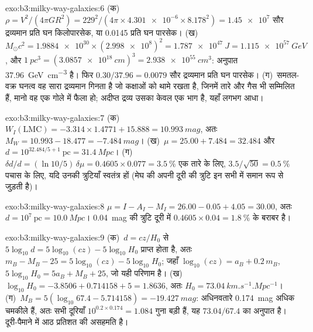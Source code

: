 \begin{solution}{exo:b3:milky-way-galaxies:6}
(क)~$\rho = V^2/(4\pi GR^2) = 229^2/(4\pi\times\num{4.301e-6}\times
8.178^2) = \num{1.45e7}$ सौर द्रव्यमान प्रति घन किलोपारसेक, या
\num{0.0145} प्रति घन पारसेक। (ख)~$M_\odot c^2 = \num{1.9884e30}\times
(\num{2.998e8})^2 = \qty{1.787e47}{J} = \qty{1.115e57}{GeV}$, और
$\qty{1}{pc^3} = (\qty{3.0857e18}{cm})^3 = \qty{2.938e55}{cm^3}$:
अनुपात \qty{37.96}{GeV.cm^{-3}} है। फिर $0.30/37.96 = \num{0.0079}$ सौर
द्रव्यमान प्रति घन पारसेक। (ग)~समतल-वक्र घनत्व वह सारा द्रव्यमान गिनता है
जो कक्षाओं को थामे रखता है, जिनमें तारे और गैस भी सम्मिलित हैं, मानो वह एक
गोले में फैला हो; अदीप्त द्रव्य उसका केवल एक भाग है, यहाँ लगभग आधा।
\end{solution}

\begin{solution}{exo:b3:milky-way-galaxies:7}
(क)~$W_I(\mathrm{LMC}) = -3.314\times1.4771 + 15.888 = \qty{10.993}{mag}$,
अतः $M_W = 10.993 - 18.477 = \qty{-7.484}{mag}$। (ख)~$\mu = 25.00 + 7.484 =
32.484$ और $d = 10^{32.484/5 + 1}~\mathrm{pc} = \qty{31.4}{Mpc}$।
(ग)~$\delta d/d = (\ln 10/5)\,\delta\mu = 0.4605\times0.077 =
\qty{3.5}{\percent}$ एक तारे के लिए, $3.5/\sqrt{50} = \qty{0.5}{\percent}$
पचास के लिए, यदि उनकी त्रुटियाँ स्वतंत्र हों (मेघ की अपनी दूरी की
त्रुटि इन सभी में समान रूप से जुड़ती है)।
\end{solution}

\begin{solution}{exo:b3:milky-way-galaxies:8}
$\mu = I - A_I - M_I = 26.00 - 0.05 + 4.05 = 30.00$, अतः $d =
10^{7}~\mathrm{pc} = \qty{10.0}{Mpc}$। \qty{0.04}{mag} की त्रुटि
दूरी में $0.4605\times0.04 = \qty{1.8}{\percent}$ के बराबर है।
\end{solution}

\begin{solution}{exo:b3:milky-way-galaxies:9}
(क)~$d = cz/H_0$ से $5\log_{10}d = 5\log_{10}(cz) - 5\log_{10}H_0$ प्राप्त होता है,
अतः $m_B - M_B - 25 = 5\log_{10}(cz) - 5\log_{10}H_0$;
जहाँ $\log_{10}(cz) = a_B + 0.2\,m_B$, $5\log_{10}H_0 = 5a_B + M_B + 25$, जो
यही परिणाम है। (ख)~$\log_{10}H_0 = -3.8506 + 0.714158 + 5 = 1.8636$, अतः
$H_0 = \qty{73.04}{km.s^{-1}.Mpc^{-1}}$। (ग)~$M_B = 5(\log_{10}67.4 -
5.714158) = \qty{-19.427}{mag}$: अधिनवतारे \qty{0.174}{mag} अधिक चमकीले हैं,
अतः सभी दूरियाँ $10^{0.2\times0.174} = 1.084$ गुना बड़ी हैं,
यह $73.04/67.4$ का अनुपात है। 
दूरी-पैमाने में आठ प्रतिशत की असहमति है।
\end{solution}


